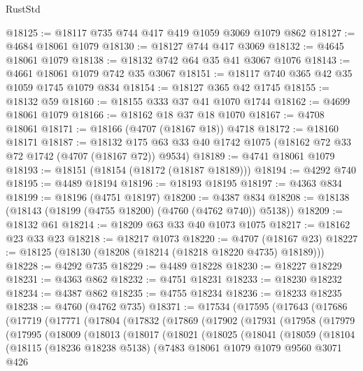\begin{lexlean}{RustStd}
\begin{coremodule}
@18125 := @18117 @735 @744 @417 @419 @1059 @3069 @1079 @862
@18127 := @4684 @18061 @1079
@18130 := @18127 @744 @417 @3069
@18132 := @4645 @18061 @1079
@18138 := @18132 @742 @64 @35 @41 @3067 @1076
@18143 := @4661 @18061 @1079 @742 @35 @3067
@18151 := @18117 @740 @365 @42 @35 @1059 @1745 @1079 @834
@18154 := @18127 @365 @42 @1745
@18155 := @18132 @59
@18160 := @18155 @333 @37 @41 @1070 @1744
@18162 := @4699 @18061 @1079
@18166 := @18162 @18 @37 @18 @1070
@18167 := @4708 @18061
@18171 := @18166 (@4707 (@18167 @18)) @4718
@18172 := @18160 @18171
@18187 := @18132 @175 @63 @33 @40 @1742 @1075 (@18162 @72 @33 @72 @1742 (@4707 (@18167 @72)) @9534)
@18189 := @4741 @18061 @1079
@18193 := @18151 (@18154 (@18172 (@18187 @18189)))
@18194 := @4292 @740
@18195 := @4489 @18194
@18196 := @18193 @18195
@18197 := @4363 @834
@18199 := @18196 (@4751 @18197)
@18200 := @4387 @834
@18208 := @18138 (@18143 (@18199 (@4755 @18200) (@4760 (@4762 @740)) @5138))
@18209 := @18132 @61
@18214 := @18209 @63 @33 @40 @1073 @1075
@18217 := @18162 @23 @33 @23
@18218 := @18217 @1073
@18220 := @4707 (@18167 @23)
@18227 := @18125 (@18130 (@18208 (@18214 (@18218 @18220 @4735) @18189)))
@18228 := @4292 @735
@18229 := @4489 @18228
@18230 := @18227 @18229
@18231 := @4363 @862
@18232 := @4751 @18231
@18233 := @18230 @18232
@18234 := @4387 @862
@18235 := @4755 @18234
@18236 := @18233 @18235
@18238 := @4760 (@4762 @735)
@18371 := @17534
    (@17595
      (@17643
        (@17686
          (@17719
            (@17771
              (@17804
                (@17832
                  (@17869
                    (@17902
                      (@17931
                        (@17958
                          (@17979
                            (@17995
                              (@18009
                                (@18013
                                  (@18017
                                    (@18021
                                      (@18025
                                        (@18041
                                          (@18059
                                            (@18104
                                              (@18115
                                                (@18236 @18238 @5138)
                                                (@7483
                                                  @18061
                                                  @1079
                                                  @1079
                                                  @9560
                                                  @3071
                                                  @426

\end{coremodule}
\end{lexlean}
